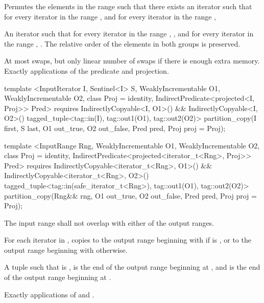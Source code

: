 \begin{itemdescr}
\pnum
\effects Permutes the elements in the range  such that there exists an iterator 
such that for every iterator  in the range 
, and for every iterator  in the
range , 

\pnum
\returns
An iterator
such that for every iterator
in the range
,
,
and for every iterator
in the range
,
.
The relative order of the elements in both groups is preserved.

\pnum
\complexity
At most
swaps, but only linear number of swaps if there is enough extra memory.
Exactly
applications of the predicate and projection.
\end{itemdescr}

%
\begin{itemdecl}
template <InputIterator I, Sentinel<I> S, WeaklyIncrementable O1, WeaklyIncrementable O2,
    class Proj = identity, IndirectPredicate<projected<I, Proj>> Pred>
  requires IndirectlyCopyable<I, O1>() && IndirectlyCopyable<I, O2>()
  tagged_tuple<tag::in(I), tag::out1(O1), tag::out2(O2)>
    partition_copy(I first, S last, O1 out_true, O2 out_false, Pred pred,
                   Proj proj = Proj{});

template <InputRange Rng, WeaklyIncrementable O1, WeaklyIncrementable O2,
    class Proj = identity,
    IndirectPredicate<projected<iterator_t<Rng>, Proj>> Pred>
  requires IndirectlyCopyable<iterator_t<Rng>, O1>() &&
    IndirectlyCopyable<iterator_t<Rng>, O2>()
  tagged_tuple<tag::in(safe_iterator_t<Rng>), tag::out1(O1), tag::out2(O2)>
    partition_copy(Rng&& rng, O1 out_true, O2 out_false, Pred pred, Proj proj = Proj{});
\end{itemdecl}

\begin{itemdescr}
\pnum
\requires The input range shall not overlap with
either of the output ranges.

\pnum
\effects For each iterator  in , copies  to the output range
beginning with  if
 is , or to
the output range beginning with  otherwise.

\pnum
\returns A tuple  such that  is ,
 is the end of the output range beginning at ,
and  is the end of the output range beginning at .

\pnum
\complexity Exactly  applications of  and .
\end{itemdescr}

